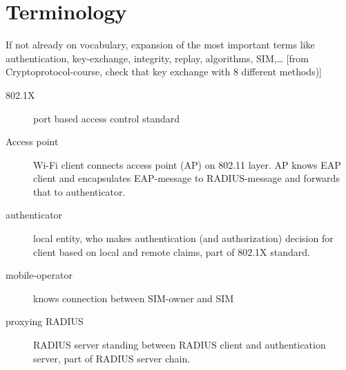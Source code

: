 \documentclass[12pt,a4paper,english]{tutthesis}
\begin{document}

\chapter*{Terminology}
\markboth{}{}                                %

If not already on vocabulary, expansion of the most important terms like
authentication, key-exchange, integrity, replay, algorithms, SIM,\ldots{}
[from Cryptoprotocol-course, check that key exchange with 8 different methods)]

\begin{description}
\item[{802.1X}] port based access control standard
\item[{Access point}] Wi-Fi client connects access point (AP) on 802.11
layer. AP knows EAP client and encapsulates EAP-message
to RADIUS-message and forwards that to
authenticator.
\end{description}
\begin{description}
\item[{authenticator}] local entity, who makes authentication (and
authorization) decision for client based on local and remote
claims, part of 802.1X standard.
\end{description}
\begin{description}
\item[{mobile-operator}] knows connection between SIM-owner and SIM
\end{description}
\begin{description}
\item[{proxying RADIUS}] RADIUS server standing between RADIUS
client and authentication server, part of RADIUS server chain.
\end{description}



\if@twoside
\cleardoublepage
\fi

\newpage             %
\setcounter{page}{1} %
\renewcommand{\chaptername}{} %
\end{document}
